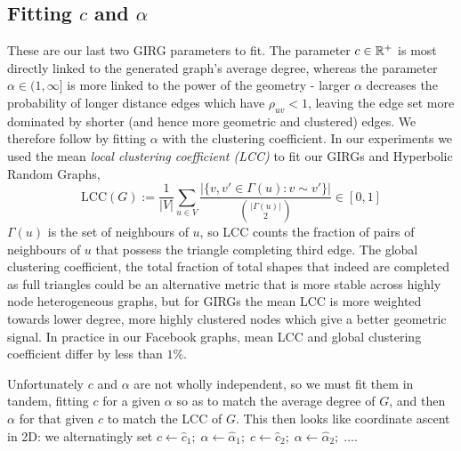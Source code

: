 \subsection{Fitting $c$ and $\alpha$}
\label{subsec:fitting_c_and_alpha}
These are our last two GIRG parameters to fit.
The parameter $c \in \mathbb{R}^+$ is most directly linked to the generated graph's average degree, whereas the parameter $\alpha \in (1, \infty]$ is more linked to the power of the geometry - larger $\alpha$ decreases the probability of longer distance edges which have $\rho_{uv} < 1$, leaving the edge set more dominated by shorter (and hence more geometric and clustered) edges. We therefore follow \cite{blasius2018towards} by fitting $\alpha$ with the clustering coefficient. In our experiments we used the mean \textit{local clustering coefficient (LCC)} to fit our GIRGs and Hyperbolic Random Graphs, 
\begin{equation}
    \mathrm{LCC}(G) := \frac{1}{|V|} \sum_{u \in V} 
    \frac{| \{ v, v' \in \Gamma(u): v \sim v'\} |}{{|\Gamma(u)| \choose 2}} \in [0, 1]
\end{equation}
$\Gamma(u)$ is the set of neighbours of $u$, so LCC counts the fraction of pairs of neighbours of $u$ that possess the triangle completing third edge. The global clustering coefficient, the total fraction of total  shapes that indeed are completed as full triangles could be an alternative metric that is more stable across highly node heterogeneous graphs, but for GIRGs the mean LCC is more weighted towards lower degree, more highly clustered nodes which give a better geometric signal. In practice in our Facebook graphs, mean LCC and global clustering coefficient differ by less than $1\%$.

Unfortunately $c$ and $\alpha$ are not wholly independent, so we must fit them in tandem, fitting $c$ for a given $\alpha$ so as to match the average degree of $G$, and then $\alpha$ for that given $c$ to match the LCC of $G$. This then looks like coordinate ascent in 2D: we alternatingly set $c \gets \hat{c}_1;\; \alpha \gets \hat{\alpha}_1;\; c \gets \hat{c}_2;\; \alpha \gets \hat{\alpha}_2;\; ...$.

